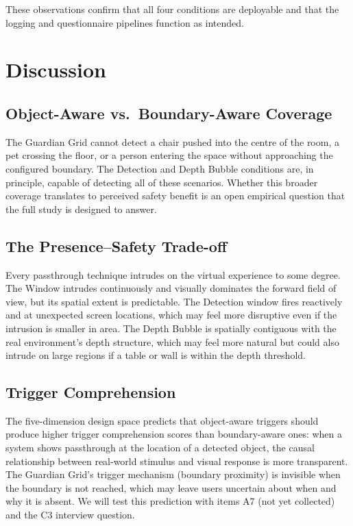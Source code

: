 \documentclass{styling/vgtc} %
\begin{document}
These observations confirm that all four conditions are deployable and
that the logging and questionnaire pipelines function as intended.


\section{Discussion}
\label{sec:discussion}

\subsection{Object-Aware vs.\ Boundary-Aware Coverage}

The Guardian Grid cannot detect a chair pushed into the centre of the
room, a pet crossing the floor, or a person entering the space without
approaching the configured boundary. The Detection and Depth Bubble
conditions are, in principle, capable of detecting all of these
scenarios. Whether this broader coverage translates to perceived safety
benefit is an open empirical question that the full study is designed to
answer.

\subsection{The Presence--Safety Trade-off}

Every passthrough technique intrudes on the virtual experience to some
degree. The Window intrudes continuously and visually dominates the
forward field of view, but its spatial extent is predictable. The
Detection window fires reactively and at unexpected screen locations,
which may feel more disruptive even if the intrusion is smaller in area.
The Depth Bubble is spatially contiguous with the real environment's
depth structure, which may feel more natural but could also intrude on
large regions if a table or wall is within the depth threshold.

\subsection{Trigger Comprehension}

The five-dimension design space predicts that object-aware triggers
should produce higher trigger comprehension scores than boundary-aware
ones: when a system shows passthrough at the location of a detected
object, the causal relationship between real-world stimulus and
visual response is more transparent. The Guardian Grid's trigger
mechanism (boundary proximity) is invisible when the boundary is not
reached, which may leave users uncertain about when and why it is absent.
We will test this prediction with items A7 (not yet collected) and the
C3 interview question.
\end{document}
